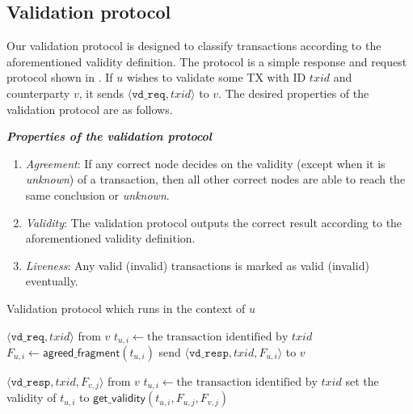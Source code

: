 \subsection{Validation protocol}
Our validation protocol is designed to classify transactions according to the aforementioned validity definition.
The protocol is a simple response and request protocol shown in .
If $u$ wishes to validate some TX with ID $txid$ and counterparty $v$, it sends $\langle \texttt{vd\_req}, txid \rangle$ to $v$.
The desired properties of the validation protocol are as follows.
\begin{definition}
\label{def:validation}
\textbf{\emph{Properties of the validation protocol}}

\begin{enumerate}
    \item \emph{Agreement}:
        If any correct node decides on the validity (except when it is \emph{unknown}) of a transaction,
        then all other correct nodes are able to reach the same conclusion or \emph{unknown}.
    \item \emph{Validity}:
        The validation protocol outputs the correct result
        according to the aforementioned validity definition.
    \item \emph{Liveness}:
        Any valid (invalid) transactions is marked as valid (invalid) eventually.
\end{enumerate}
\end{definition}

\begin{algorithm}
\caption{Validation protocol which runs in the context of $u$}
\label{alg:vd-proto}

\begin{algorithmic}
    \Upon $\langle \texttt{vd\_req}, txid \rangle$ from $v$
        \State $t_{u, i} \gets \text{the transaction identified by } txid$
        \State $F_{u, i} \gets \textsf{agreed\_fragment}(t_{u, i})$
        \State send $\langle \texttt{vd\_resp}, txid, F_{u, i} \rangle$ to $v$

    \Upon $\langle \texttt{vd\_resp}, txid, F_{v, j} \rangle$ from $v$
        \State $t_{u, i} \gets \text{the transaction identified by } txid$
            \State set the validity of $t_{u, i}$ to $\textsf{get\_validity}(t_{u, i}, F_{u, j}, F_{v, j})$
        \EndIf
\end{algorithmic}
\end{algorithm}

